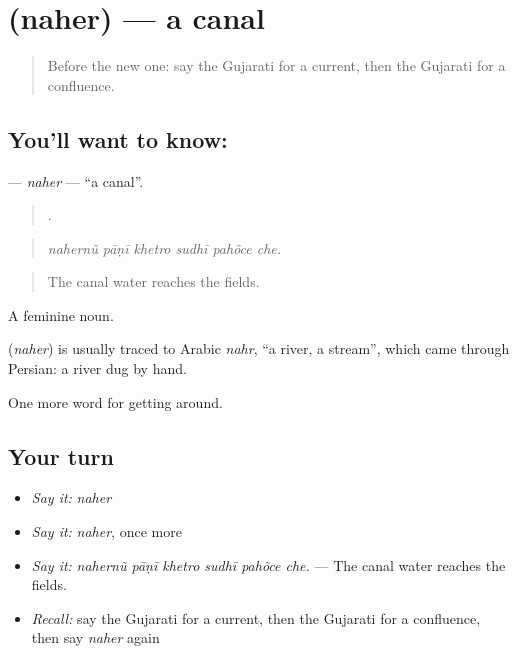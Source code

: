 \section[\texorpdfstring{\gu{નહેર} (naher)}{નહેર (naher)}]{ (naher) — a canal}

\label{lesson:GU-C440-naher}



\begin{quote}
Before the new one: say the Gujarati for a current, then the Gujarati for a confluence.
\end{quote}

\subsection*{You'll want to know: }
\textbf{} — \emph{naher} — \textquotedblleft{}a canal\textquotedblright{}.

\begin{quote}
     .
\end{quote}

\begin{quote}
\emph{nahernũ pāṇī khetro sudhī pahõce che.}
\end{quote}

\begin{quote}
The canal water reaches the fields.
\end{quote}

A feminine noun.

\begin{cousinweb}
\textbf{} (\emph{naher}) is usually traced to Arabic \emph{nahr}, \textquotedblleft{}a river, a stream\textquotedblright{}, which came through Persian: a river dug by hand.
\end{cousinweb}

\begin{grammarlens}[title={What you've built}]
One more word for getting around.
\end{grammarlens}

\subsection*{Your turn}
\begin{itemize}
\raggedright
  \item \emph{Say it:} \emph{naher}
  \item \emph{Say it:} \emph{naher}, once more
  \item \emph{Say it:} \emph{nahernũ pāṇī khetro sudhī pahõce che.} — The canal water reaches the fields.
  \item \emph{Recall:} say the Gujarati for a current, then the Gujarati for a confluence, then say \emph{naher} again
\end{itemize}

